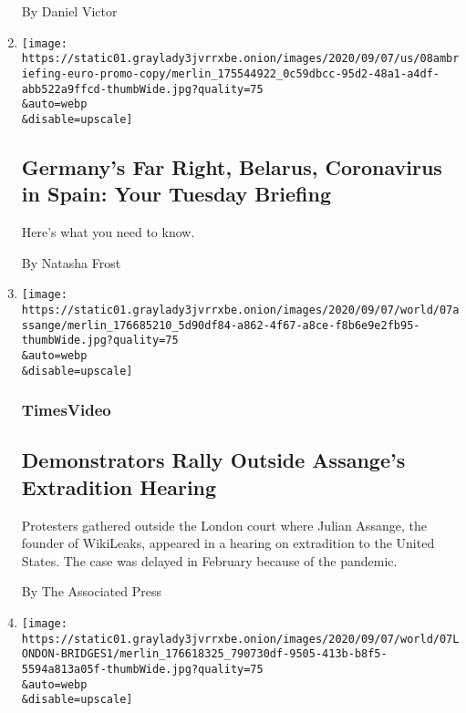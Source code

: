 \begin{enumerate}
  By Daniel Victor
\item
  \href{/2020/09/07/briefing/germany-far-right-belarus-coronavirus-spain.html}{}

  \texttt{[image: https://static01.graylady3jvrrxbe.onion/images/2020/09/07/us/08ambriefing-euro-promo-copy/merlin\_175544922\_0c59dbcc-95d2-48a1-a4df-abb522a9ffcd-thumbWide.jpg?quality=75\\\&auto=webp\\\&disable=upscale]}

  \hypertarget{germanys-far-right-belarus-coronavirus-in-spain-your-tuesday-briefing}{%
  \subsection{Germany's Far Right, Belarus, Coronavirus in Spain: Your
  Tuesday
  Briefing}\label{germanys-far-right-belarus-coronavirus-in-spain-your-tuesday-briefing}}

  Here's what you need to know.

  By Natasha Frost
\item
  \href{/video/world/europe/100000007328136/julian-assange-extradition-hearing.html}{}

  \texttt{[image: https://static01.graylady3jvrrxbe.onion/images/2020/09/07/world/07assange/merlin\_176685210\_5d90df84-a862-4f67-a8ce-f8b6e9e2fb95-thumbWide.jpg?quality=75\\\&auto=webp\\\&disable=upscale]}

  \hypertarget{timesvideo}{%
  \subsubsection{TimesVideo}\label{timesvideo}}

  \hypertarget{demonstrators-rally-outside-assanges-extradition-hearing}{%
  \subsection{Demonstrators Rally Outside Assange's Extradition
  Hearing}\label{demonstrators-rally-outside-assanges-extradition-hearing}}

  Protesters gathered outside the London court where Julian Assange, the
  founder of WikiLeaks, appeared in a hearing on extradition to the
  United States. The case was delayed in February because of the
  pandemic.

  By The Associated Press
\item
  \href{/2020/09/07/world/europe/london-bridges.html}{}

  \texttt{[image: https://static01.graylady3jvrrxbe.onion/images/2020/09/07/world/07LONDON-BRIDGES1/merlin\_176618325\_790730df-9505-413b-b8f5-5594a813a05f-thumbWide.jpg?quality=75\\\&auto=webp\\\&disable=upscale]}


\end{enumerate}
